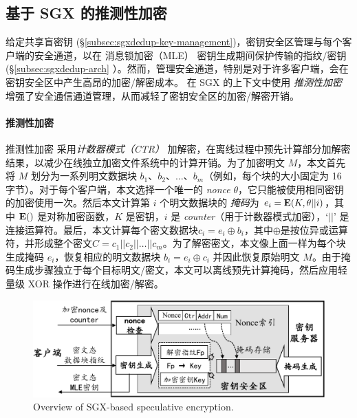 \subsection{基于 SGX 的推测性加密}
\label{subsec:sgxdedup-encryption}

给定共享盲密钥 (\S\ref{subsec:sgxdedup-key-management})，密钥安全区管理与每个客户端的安全通道，以在 消息锁加密（MLE） 密钥生成期间保护传输的指纹/密钥 (\S\ref{subsec:sgxdedup-arch} ）。然而，管理安全通道，特别是对于许多客户端，会在密钥安全区中产生高昂的加密/解密成本。 \sysnameS 在 SGX 的上下文中使用 \textit{ 推测性加密} \cite{eduardo2019Speculative} 增强了安全通信通道管理，从而减轻了密钥安全区的加密/解密开销。

\paragraph*{推测性加密} 推测性加密 \cite{eduardo2019Speculative} 采用\textit{计数器模式（CTR）} \cite{counter} 加解密，在离线过程中预先计算部分加解密结果，以减少在线独立加密文件系统中的计算开销。为了加密明文 $M$，本文首先将 $M$ 划分为一系列明文数据块 $b_1、b_2、\ldots、b_m$（例如，每个块的大小固定为 16 字节）。对于每个客户端，本文选择一个唯一的 \textit{ nonce} $\theta$，它只能被使用相同密钥的加密使用一次。然后本文计算第 $i$ 个明文数据块的 \textit{掩码}为 $e_i = {\bf E}(K, \theta || i)$，其中 ${\bf E}()$ 是对称加密函数，$K$ 是密钥，$i$ 是 \textit{ counter}（用于计数器模式加密），`$||$' 是连接运算符。最后，本文计算每个密文数据块$c_i = e_i \oplus b_i $，其中$\oplus$是按位异或运算符，并形成整个密文$C = c_1 || c_2 || \ldots || c_m$。为了解密密文，本文像上面一样为每个块生成掩码 $e_i$，恢复相应的明文数据块 $b_i = e_i \oplus c_i$ 并因此恢复原始明文 $M$。由于掩码生成步骤独立于每个目标明文/密文，本文可以离线预先计算掩码，然后应用轻量级 XOR 操作进行在线加密/解密。

\begin{figure}[t]
\centering
\includegraphics[width=\textwidth]{pic/sgxdedup/key-enclave-arch.pdf}
\caption{Overview of SGX-based speculative encryption.}
\label{fig:sgxdedup-SpecEnc}
\end{figure}

